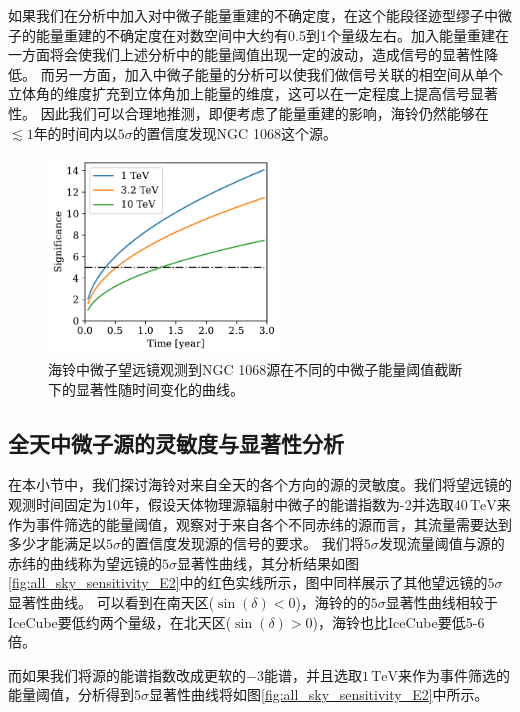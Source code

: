 如果我们在分析中加入对中微子能量重建的不确定度，在这个能段径迹型缪子中微子的能量重建的不确定度在对数空间中大约有0.5到1个量级左右。加入能量重建在一方面将会使我们上述分析中的能量阈值出现一定的波动，造成信号的显著性降低。
而另一方面，加入中微子能量的分析可以使我们做信号关联的相空间从单个立体角的维度扩充到立体角加上能量的维度，这可以在一定程度上提高信号显著性。
因此我们可以合理地推测，即便考虑了能量重建的影响，海铃仍然能够在$\lesssim 1$年的时间内以$5\sigma$的置信度发现NGC 1068这个源。

\begin{figure}[!htb]%
    \centering
    \includegraphics[width=0.55\textwidth]{img/ngc_significance_time_curve.pdf}
    \caption{海铃中微子望远镜观测到NGC 1068源在不同的中微子能量阈值截断下的显著性随时间变化的曲线。}
    \label{fig:ngc_significance_time_curve}
\end{figure}

\subsection{全天中微子源的灵敏度与显著性分析}

在本小节中，我们探讨海铃对来自全天的各个方向的源的灵敏度。我们将望远镜的观测时间固定为10年，假设天体物理源辐射中微子的能谱指数为-2并选取$40\,\mathrm{TeV}$来作为事件筛选的能量阈值，观察对于来自各个不同赤纬的源而言，其流量需要达到多少才能满足以$5\sigma$的置信度发现源的信号的要求。
我们将$5\sigma$发现流量阈值与源的赤纬的曲线称为望远镜的$5\sigma$显著性曲线，其分析结果如图\ref{fig:all_sky_sensitivity_E2}中的红色实线所示，图中同样展示了其他望远镜的$5\sigma$显著性曲线。
可以看到在南天区($\sin(\delta)<0$)，海铃的的$5\sigma$显著性曲线相较于IceCube要低约两个量级，在北天区($\sin(\delta)>0$)，海铃也比IceCube要低5-6倍。

而如果我们将源的能谱指数改成更软的$-3$能谱，并且选取$1\,\mathrm{TeV}$来作为事件筛选的能量阈值，分析得到$5\sigma$显著性曲线将如图\ref{fig:all_sky_sensitivity_E2}中所示。


